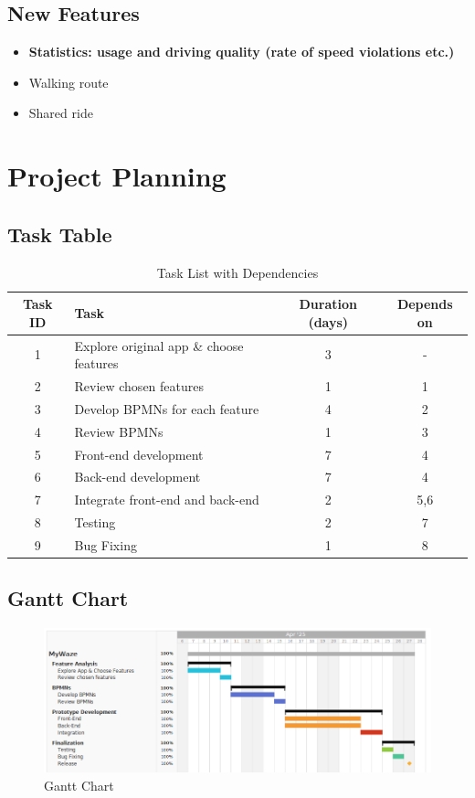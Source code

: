 \documentclass{article}
\begin{document}
\subsection*{New Features}
\begin{itemize}
    \item \textbf{Statistics: usage and driving quality (rate of speed violations etc.)}
    \item Walking route
    \item Shared ride
\end{itemize}

\section*{Project Planning}

\subsection*{Task Table}

\begin{table}[h!]
  \centering
  \begin{tabular}{|c|p{6cm}|c|c|}
  \hline
  \textbf{Task ID} & \textbf{Task} & \textbf{Duration (days)} & \textbf{Depends on} \\
  \hline
  1 & Explore original app \& choose features & 3 & - \\
  2 & Review chosen features & 1 & 1 \\
  3 & Develop BPMNs for each feature & 4 & 2 \\
  4 & Review BPMNs & 1 & 3 \\
  5 & Front-end development & 7 & 4 \\
  6 & Back-end development & 7 & 4 \\
  7 & Integrate front-end and back-end & 2 & 5,6 \\
  8 & Testing & 2 & 7 \\
  9 & Bug Fixing & 1 & 8 \\
  \hline
  \end{tabular}
  \caption{Task List with Dependencies}
  \label{tab:tasklist}
\end{table}

\subsection*{Gantt Chart}

\begin{figure}[h]
  \centering
  \includegraphics[width=\textwidth]{images/gantt_chart.png}
  \caption{Gantt Chart}
  \label{fig:gantt_chart}
\end{figure}
\end{document}
